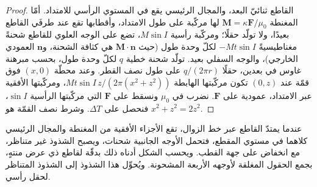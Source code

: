 \begin{proof}
القاطع ثنائيّ البعد، والمجال الرئيسي يقع في المستوي الرأسي
للامتداد. أمّا المغنطة $\mathbf{M} = \kappa\mathbf{F}/\mu_0$
لها مركّبة على طول الامتداد، وأقطابها تقع عند طرفَي
القاطع بعيدًا، ولا تولّد حقلًا؛ ومركّبة رأسية $M
\sin I$، تضع على الوجه العلوي للقاطع شحنةً مغناطيسيةً
$-Mt\sin I$ لكلّ وحدة طول (حيث $\mathbf{M}\cdot\mathbf{n}$ هي
كثافة الشحنة، و$\mathbf{n}$ العمودي الخارجي)، والوجه السفلي
بعيد. تولّد شحنة خطية $q$ لكلّ وحدة طول، بحسب مبرهنة غاوس
في بعدين، حقلًا $q/(2\pi r)$ على طول نصف القطر. وعند
محطّة $(x, 0)$ فوق قمّة عند $(0, z)$ تكون مركّبتها الهابطة
$Mt\sin I\,z/(2\pi(x^2 + z^2))$، ومركّبتها الأفقية
عبر الامتداد، عمودية على $\mathbf{F}$. نضرب في
$\mu_0$ ونسقط على $\mathbf{F}$ التي مركّبتها الرأسية
$\sin I$، فنحصل على $\Delta T$. وشرط نصف القمّة هو $x^2 + z^2 =
2z^2$.
\end{proof}

عندما يمتدّ القاطع عبر خط الزوال، تقع الأجزاء الأفقية من
المغنطة والمجال الرئيسي كلاهما في مستوي
المقطع، فتحمل الأوجه الجانبية شحنات، ويصبح الشذوذ
غير متناظر، مع انخفاض على جهة القطب. ويحسب الشكل أدناه
ذلك بدقّة لقاطع ذي عرض منتهٍ، بجمع الحقول المغلقة
لأوجهه الأربعة المشحونة. ويُحوِّل  هذا
الشذوذ إلى الشذوذ المتناظر لحقل رأسي.

